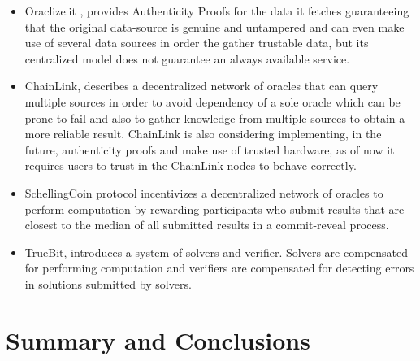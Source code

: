 \begin{itemize}
  \item Oraclize.it \cite{Oraclize.it2018OraclizeDocumentation}, provides Authenticity Proofs for the data it fetches guaranteeing that the original data-source is genuine and untampered and can even make use of several data sources in order the gather trustable data, but its centralized model does not guarantee an always available service.
  \item ChainLink\cite{Ellis2017ChainLinkNetwork}, describes a decentralized network of oracles that can query multiple sources in order to avoid dependency of a sole oracle which can be prone to fail and also to gather knowledge from multiple sources to obtain a more reliable result. ChainLink is also considering implementing, in the future, authenticity proofs and make use of trusted hardware, as of now it requires users to trust in the ChainLink nodes to behave correctly.
  \item SchellingCoin protocol incentivizes a decentralized network of oracles
        to perform computation by rewarding participants who submit results
        that are closest to the median of all submitted results in a commit-reveal
        process.
  \item TrueBit, introduces a system of solvers and verifier. Solvers are
        compensated for performing computation and verifiers are compensated
        for detecting errors in solutions submitted by solvers.
\end{itemize}


\section{Summary and Conclusions}


